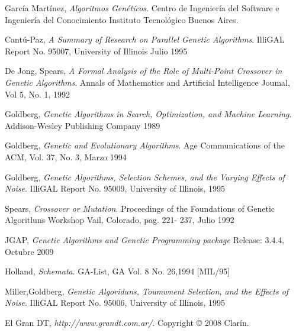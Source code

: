 \documentclass[pdftex,a4paper,10.5pt]{article}
\begin{document}
\begin{thebibliography}{9}

 García Mart\'inez,
 \emph{Algoritmos Gen\'eticos}.
 Centro de Ingenier\'ia del Software e Ingenier\'ia del Conocimiento
 Instituto Tecnológico Buenos Aires. 

 Cant\'u-Paz,
 \emph{A Summary of Research on Parallel Genetic Algorithms}.
 IlliGAL Report No. 95007, University of Illinois
 Julio 1995

 De Jong, Spears,
 \emph{A Formal Analysis of the Role of Multi-Point Crossover in Genetic Algorithms}.
Annals of Mathematics and Artificial Intelligence Joumal,
 Vol 5, No. 1, 1992

 Goldberg,
 \emph{Genetic Algorithms in Search, Optimization, and Machine Learning}.
 Addison-Wesley Publishing Company
 1989
 
 Goldberg,
 \emph{Genetic and Evolutionary Algorithms}.
 Age Communications of the
 ACM, Vol. 37, No. 3, 
 Marzo 1994

 Goldberg,
 \emph{Genetic Algorithms, Selection Schemes, and the Varying Effects of Noise}.
 IlliGAL Report No. 95009, 
 University of Illinois, 
 1995
 
 Spears,
 \emph{Crossover or Mutation}.
 Proceedings of the Foundations of Genetic Algoritluns Workshop Vail, Colorado, pag. 221- 237,
 Julio 1992
 
 JGAP, 
 \emph{Genetic Algorithms and Genetic Programming package}
 Release: 3.4.4,
 Octubre 2009
 

 Holland,
 \emph{Schemata}.
  GA-List, GA Vol. 8 No. 26,1994 [MIL/95]
  
 Miller,Goldberg, 
 \emph{Genetic Algoriduns, Toumwnent Selection, and the Effects of Noise}.
 IlliGAL Report No. 95006, University of Illinois, 1995
 
 El Gran DT, 
 \emph{http://www.grandt.com.ar/}.
 Copyright © 2008 Clar\'in.
  

  
\end{thebibliography}

\end{document}
